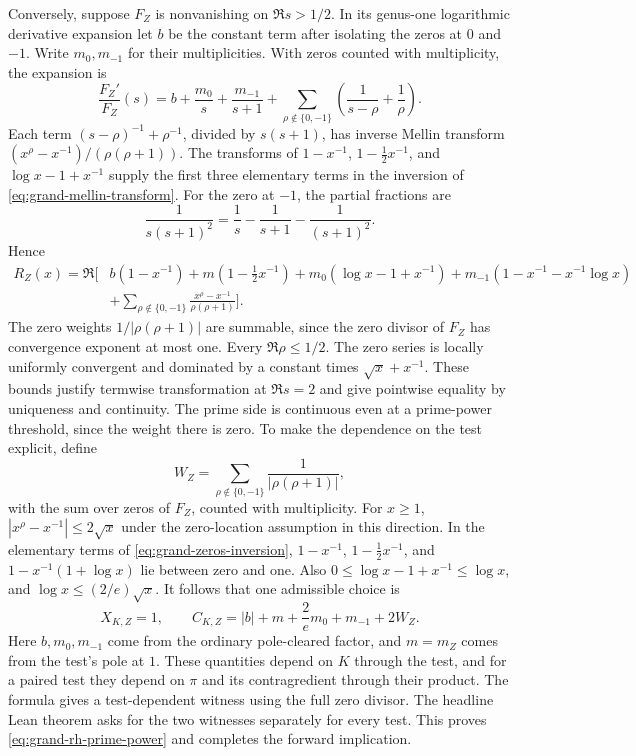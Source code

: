 \documentclass[11pt]{amsart}
\theoremstyle{definition}
\theoremstyle{remark}
\numberwithin{equation}{section}
\begin{document}
Conversely, suppose \(F_Z\) is nonvanishing on \(\Re s>1/2\).
In its genus-one logarithmic derivative expansion let \(b\) be
the constant term after isolating the zeros at \(0\) and \(-1\).
Write \(m_0,m_{-1}\) for their multiplicities. With zeros counted
with multiplicity, the expansion is
\[
 \frac{F_Z'}{F_Z}(s)
   = b+\frac{m_0}{s}+\frac{m_{-1}}{s+1}
     +\sum_{\rho\notin\{0,-1\}}
                  \left(\frac{1}{s-\rho}+\frac1\rho\right).
\]
Each term \((s-\rho)^{-1}+\rho^{-1}\), divided by \(s(s+1)\),
has inverse Mellin transform
\((x^\rho-x^{-1})/(\rho(\rho+1))\).
The transforms of \(1-x^{-1}\), \(1-\tfrac12x^{-1}\), and
\(\log x-1+x^{-1}\) supply the first three elementary terms in
the inversion of \eqref{eq:grand-mellin-transform}. For the zero
at \(-1\), the partial fractions are
\[
 \frac{1}{s(s+1)^2}=\frac1s-\frac1{s+1}-\frac1{(s+1)^2}.
\]
Hence
\begin{align}
 R_Z(x)=\Re\Bigg[&
 b(1-x^{-1})+m(1-\tfrac12x^{-1})
 +m_0(\log x-1+x^{-1})
 +m_{-1}(1-x^{-1}-x^{-1}\log x)
 \nonumber\\
 &+\sum_{\rho\notin\{0,-1\}}
             \frac{x^\rho-x^{-1}}{\rho(\rho+1)}\Bigg].
 \label{eq:grand-zeros-inversion}
\end{align}
The zero weights \(1/|\rho(\rho+1)|\) are summable, since the
zero divisor of \(F_Z\) has convergence exponent at most one.
Every \(\Re\rho\leq 1/2\). The zero series is locally uniformly
convergent and dominated by a constant times \(\sqrt{x}+x^{-1}\).
These bounds justify termwise transformation at \(\Re s=2\) and
give pointwise equality by uniqueness and continuity. The prime
side is continuous even at a prime-power threshold, since the
weight there is zero. To make the dependence on the test
explicit, define
\[
 W_Z=\sum_{\rho\notin\{0,-1\}}\frac{1}{|\rho(\rho+1)|},
\]
with the sum over zeros of \(F_Z\), counted with multiplicity.
For \(x\ge1\), \(|x^\rho-x^{-1}|\le2\sqrt{x}\) under
the zero-location assumption in this direction. In the
elementary terms of \eqref{eq:grand-zeros-inversion},
\(1-x^{-1}\), \(1-\tfrac12x^{-1}\), and
\(1-x^{-1}(1+\log x)\) lie between zero and one.
Also \(0\le\log x-1+x^{-1}\le\log x\), and
\(\log x\le(2/e)\sqrt{x}\). It follows that one admissible
choice is
\[
 X_{K,Z}=1,\qquad
 C_{K,Z}=|b|+m+\frac{2}{e}m_0+m_{-1}+2W_Z .
\]
Here \(b,m_0,m_{-1}\) come from the ordinary pole-cleared
factor, and \(m=m_Z\) comes from the test's pole at \(1\).
These quantities depend on \(K\) through the test, and for a
paired test they depend on \(\pi\) and its contragredient
through their product. The formula gives a test-dependent
witness using the full zero divisor. The headline Lean theorem
asks for the two witnesses separately for every test. This proves
\eqref{eq:grand-rh-prime-power} and completes the forward implication.
\end{document}
